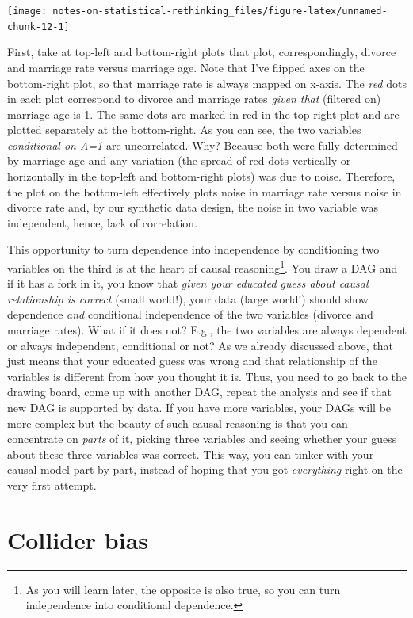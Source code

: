 \documentclass[
]{book}
\begin{document}
\begin{center}\texttt{[image: notes-on-statistical-rethinking\_files/figure-latex/unnamed-chunk-12-1]} \end{center}

First, take at top-left and bottom-right plots that plot, correspondingly, divorce and marriage rate versus marriage age. Note that I've flipped axes on the bottom-right plot, so that marriage rate is always mapped on x-axis. The \emph{red} dots in each plot correspond to divorce and marriage rates \emph{given that} (filtered on) marriage age is 1. The same dots are marked in red in the top-right plot and are plotted separately at the bottom-right. As you can see, the two variables \emph{conditional on A=1} are uncorrelated. Why? Because both were fully determined by marriage age and any variation (the spread of red dots vertically or horizontally in the top-left and bottom-right plots) was due to noise. Therefore, the plot on the bottom-left effectively plots noise in marriage rate versus noise in divorce rate and, by our synthetic data design, the noise in two variable was independent, hence, lack of correlation.

This opportunity to turn dependence into independence by conditioning two variables on the third is at the heart of causal reasoning\footnote{As you will learn later, the opposite is also true, so you can turn independence into conditional dependence.}. You draw a DAG and if it has a fork in it, you know that \emph{given your educated guess about causal relationship is correct} (small world!), your data (large world!) should show dependence \emph{and} conditional independence of the two variables (divorce and marriage rates). What if it does not? E.g., the two variables are always dependent or always independent, conditional or not? As we already discussed above, that just means that your educated guess was wrong and that relationship of the variables is different from how you thought it is. Thus, you need to go back to the drawing board, come up with another DAG, repeat the analysis and see if that new DAG is supported by data. If you have more variables, your DAGs will be more complex but the beauty of such causal reasoning is that you can concentrate on \emph{parts} of it, picking three variables and seeing whether your guess about these three variables was correct. This way, you can tinker with your causal model part-by-part, instead of hoping that you got \emph{everything} right on the very first attempt.

\hypertarget{collider-bias}{%
\chapter{Collider bias}\label{collider-bias}}
\end{document}
